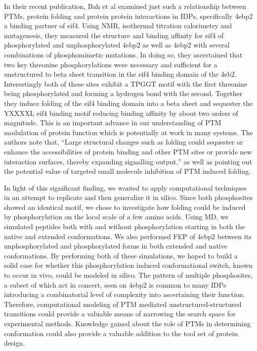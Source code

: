 In their recent publication, Bah et al examined just such a relationship between PTMs, protein folding and protein protein interactions in IDPs, specifically 4ebp2 a binding partner of eif4. \cite{bah-idp2015}
Using NMR, isothermal titration calorimetry and mutagenesis, they measured the structure and binding affinity for eif4 of phosphorylated and unphosphorylated 4ebp2 as well as 4ebp2 with several combinations of phosphomimetic mutations.
In doing so, they ascertained that two key threonine phosphorylations were necessary and sufficient for a unstructured to beta sheet transition in the eif4 binding domain of the 4eb2.
Interestingly both of these sites exhibit a TPGGT motif with the first threonine being phosphorylated and forming a hydrogen bond with the second.
Together they induce folding of the eif4 binding domain into a beta sheet and sequester the YXXXXL eif4 binding motif reducing binding affinity by about two orders of magnitude.
This is an important advance in our understanding of PTM modulation of protein function which is potentially at work in many systems.
The authors note that, “Large structural changes such as folding could sequester or enhance the accessibilities of protein binding and other PTM sites or provide new interaction surfaces, thereby expanding signalling output,” as well as pointing out the potential value of targeted small molecule inhibition of PTM induced folding.


In light of this significant finding, we wanted to apply computational techniques in an attempt to replicate and then generalize it in silico.
Since both phosphosites showed an identical motif, we chose to investigate how folding could be induced by phosphorylation on the local scale of a few amino acids.
Using MD, we simulated peptides both with and without phosphorylation starting in both the native and extended conformations.
We also performed FEP of 4ebp2 between its unphosphorylated and phosphorylated forms in both extended and native conformations.
By performing both of these simulations, we hoped to build a solid case for whether this phosphorylation induced conformational switch, known to occur in vivo, could be modeled in silico.
The pattern of multiple phosphosites, a subset of which act in concert, seen on 4ebp2 is common to many IDPs introducing a combinatorial level of complexity into ascertaining their function.
Therefore, computational modeling of PTM mediated unstructured-structured transitions could provide a valuable means of narrowing the search space for experimental methods.
Knowledge gained about the role of PTMs in determining conformation could also provide a valuable addition to the tool set of protein design.

